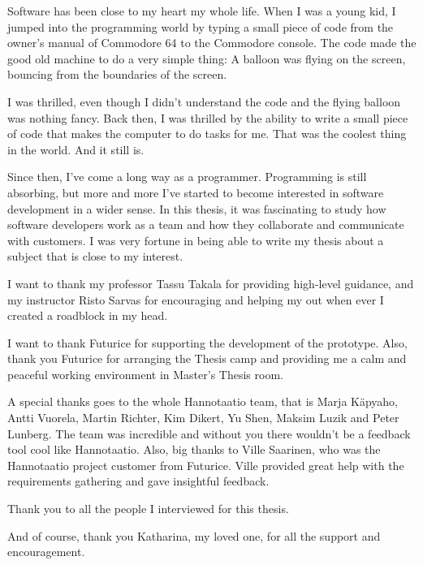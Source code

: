 \documentclass[english,12pt,a4paper,pdftex]{article}
\begin{document}


Software has been close to my heart my whole life. When I was a young kid, I jumped into the programming world by typing a small piece of code from the owner's manual of Commodore 64 to the Commodore console. The code made the good old machine to do a very simple thing: A balloon was flying on the screen, bouncing from the boundaries of the screen. 

I was thrilled, even though I didn't understand the code and the flying balloon was nothing fancy. Back then, I was thrilled by the ability to write a small piece of code that makes the computer to do tasks for me. That was the coolest thing in the world. And it still is.

Since then, I've come a long way as a programmer. Programming is still absorbing, but more and more I've started to become interested in software development in a wider sense. In this thesis, it was fascinating to study how software developers work as a team and how they collaborate and communicate with customers. I was very fortune in being able to write my thesis about a subject that is close to my interest.

I want to thank my professor Tassu Takala for providing high-level guidance, and my instructor Risto Sarvas for  encouraging and helping my out when ever I created a roadblock in my head.

I want to thank Futurice for supporting the development of the prototype. Also, thank you Futurice for arranging the Thesis camp and providing me a calm and peaceful working environment in Master's Thesis room.

A special thanks goes to the whole Hannotaatio team, that is Marja Käpyaho, Antti Vuorela, Martin Richter, Kim Dikert, Yu Shen, Maksim Luzik and Peter Lunberg. The team was incredible and without you there wouldn't be a feedback tool cool like Hannotaatio. Also, big thanks to Ville Saarinen, who was the Hannotaatio project customer from Futurice. Ville provided great help with the requirements gathering and gave insightful feedback.

Thank you to all the people I interviewed for this thesis.

And of course, thank you Katharina, my loved one, for all the support and encouragement.
\end{document}
